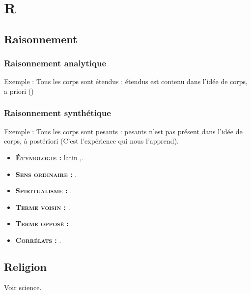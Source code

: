 \chapter{R}
\section{Raisonnement}

\subsection{Raisonnement analytique}

Exemple : Tous les corps sont étendus : étendus est contenu dans l'idée de corps, a priori ()

\subsection{Raisonnement synthétique}

Exemple : Tous les corps sont pesants :  pesants n'est pas présent dans l'idée de corps, à postériori (C'est l'expérience qui nous l'apprend).

{\footnotesize
\begin{itemize}[leftmargin=1cm, label=, itemsep=1pt]
\item {\bf \textsc{Étymologie} :} latin {\it },.
\item {\bf \textsc{Sens ordinaire} :} .
\item {\bf \textsc{Spiritualisme} :} .
\end{itemize}

\begin{itemize}[leftmargin=1cm, label=, itemsep=1pt]
\item {\bf \textsc{Terme voisin} :} .
\item {\bf \textsc{Terme opposé} :} .
\item {\bf \textsc{Corrélats} :} .
\end{itemize}
}

\section{Religion}
Voir science.
